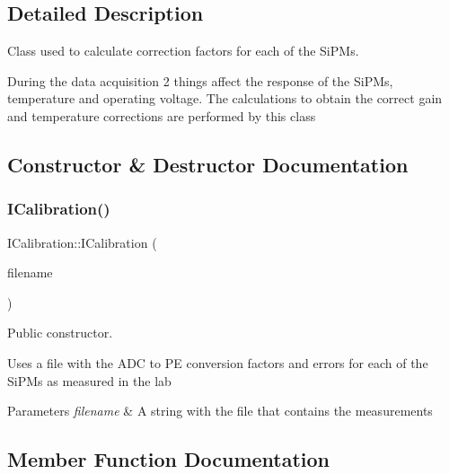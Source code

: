\subsection{Detailed Description}
Class used to calculate correction factors for each of the Si\+P\+Ms. 

During the data acquisition 2 things affect the response of the Si\+P\+Ms, temperature and operating voltage. The calculations to obtain the correct gain and temperature corrections are performed by this class 

\subsection{Constructor \& Destructor Documentation}
\mbox{\label{classICalibration_a8ffdb45c17889268d414d456f05aa18b}} 
\subsubsection{\texorpdfstring{I\+Calibration()}{ICalibration()}}
{\footnotesize\ttfamily I\+Calibration\+::\+I\+Calibration (\begin{DoxyParamCaption}\item[{const std\+::string \&}]{filename }\end{DoxyParamCaption})}



Public constructor. 

Uses a file with the A\+DC to PE conversion factors and errors for each of the Si\+P\+Ms as measured in the lab


\begin{DoxyParams}{Parameters}
{\em filename} & A string with the file that contains the measurements \\
\hline
\end{DoxyParams}


\subsection{Member Function Documentation}
\mbox{\label{classICalibration_a608320bee8a2e8c3d7442948e9de619a}} 

